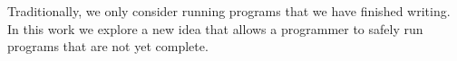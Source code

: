 Traditionally, we only consider running programs that we have finished
writing.  In this work we explore a new idea that allows a programmer to
safely run programs that are not yet complete.
